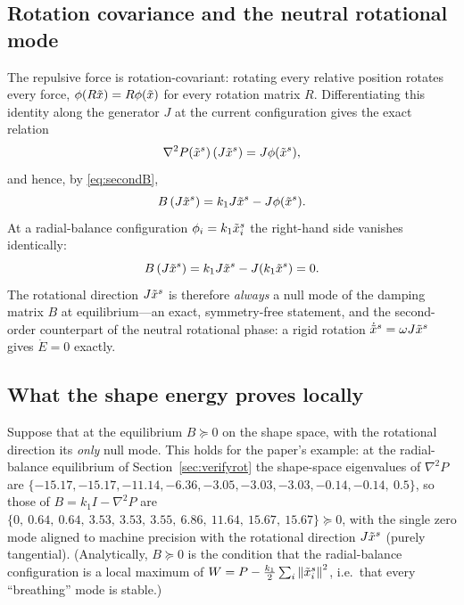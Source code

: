 \subsection{Rotation covariance and the neutral rotational mode}
\label{sec:rotcov}

The repulsive force is rotation-covariant: rotating every relative position rotates every force,
$\phi(R\tilde{x})=R\phi(\tilde{x})$ for every rotation matrix $R$. Differentiating this identity along the
generator $J$ at the current configuration gives the exact relation
\begin{equation}
  \nabla^2 P(\tilde{x}^s)\,(J\tilde{x}^s)=J\phi(\tilde{x}^s),
  \label{eq:rotcov}
\end{equation}
and hence, by \eqref{eq:secondB},
\begin{equation}
  B\,(J\tilde{x}^s)=k_1J\tilde{x}^s-J\phi(\tilde{x}^s) .
  \label{eq:Brot}
\end{equation}
At a radial-balance configuration $\phi_i=k_1\tilde{x}_i^s$ the right-hand side vanishes identically:
\begin{equation}
  B\,(J\tilde{x}^s)=k_1J\tilde{x}^s-J(k_1\tilde{x}^s)=0 .
  \label{eq:Brot0}
\end{equation}
The rotational direction $J\tilde{x}^s$ is therefore \emph{always} a null mode of the damping matrix $B$
at equilibrium---an exact, symmetry-free statement, and the second-order counterpart of the neutral
rotational phase: a rigid rotation $\dot{\tilde{x}}^s=\omega J\tilde{x}^s$ gives $\dot E=0$ exactly.

\subsection{What the shape energy proves locally}
\label{sec:lasalle}

Suppose that at the equilibrium $B\succeq0$ on the shape space, with the rotational direction its
\emph{only} null mode. This holds for the paper's example: at the radial-balance equilibrium of
Section~\ref{sec:verifyrot} the shape-space eigenvalues of $\nabla^2 P$ are
$\{-15.17,-15.17,-11.14,-6.36,-3.05,-3.03,-3.03,-0.14,-0.14,\ 0.5\}$, so those of
$B=k_1I-\nabla^2P$ are $\{0,\ 0.64,\ 0.64,\ 3.53,\ 3.53,\ 3.55,\ 6.86,\ 11.64,\ 15.67,\ 15.67\}\succeq0$,
with the single zero mode aligned to machine precision with the rotational direction $J\tilde{x}^s$
(purely tangential). (Analytically, $B\succeq0$ is the condition that the radial-balance
configuration is a local maximum of $W=P-\tfrac{k_1}{2}\sum_i\left\| \tilde{x}_i^s \right\|^2$, i.e.\ that every
``breathing'' mode is stable.)

